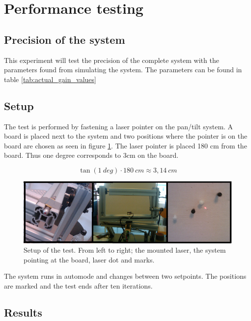 \section{Performance testing}

\subsection{Precision of the system}\label{subsec:precisionofsystem}
This experiment will test the precision of the complete system with the
parameters found from simulating the system. The parameters can be found in
table \ref{tab:actual_gain_values}

\subsection*{Setup}

The test is performed by fastening a laser pointer on the pan/tilt system. A
board is placed next to the system and two positions where the pointer is on the
board are chosen as seen in figure \ref{fig:systemtestsetup}. The laser pointer is placed 180 cm
from the board. Thus one degree corresponds to 3cm on the board.

\[ \tan(1 \ deg) \cdot 180 \ cm \approx 3,14 \ cm \]


\begin{figure}[htb] \centering \includegraphics[width=\textwidth,trim=0 0 0
0]{graphics/overallsystemtest.png} %
	\caption{Setup of the test. From left to right; the mounted laser, the system pointing at the board, laser dot and marks.}
	\label{fig:systemtestsetup}			%
\end{figure}

The system runs in automode and changes between two setpoints. The positions
are marked and the test ends after ten iterations. 

\subsection*{Results}

